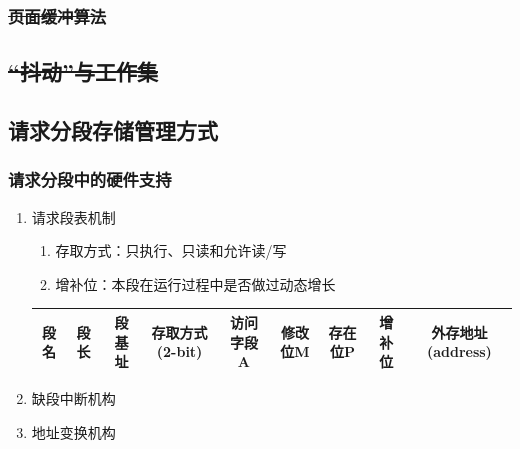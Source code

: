 \documentclass{article}
\begin{document}
\subsubsection{\sout{页面缓冲算法}}
\vspace*{-0.2cm}
\subsection{\sout{“抖动”与工作集}}
\vspace*{-0.2cm}

\subsection{请求分段存储管理方式}
\subsubsection{\color{red}请求分段中的硬件支持}
\begin{enumerate}
    \item 请求段表机制
    \begin{enumerate}
        \item 存取方式：只执行、只读和允许读/写
        \item 增补位：本段在运行过程中是否做过动态增长
    \end{enumerate}

    \begin{center}
        \begin{adjustbox}{width=\textwidth,center}
            \begin{tabular}{|c|c|c|c|c|c|c|c|c|}
                \hline
                {\color{gray}段名} & {\color{gray}段长}& {\color{gray}段基址}
                & 存取方式{\color{red}(2-bit)} & 访问字段A
                & 修改位M & 存在位P
                & 增补位   & 外存地址{\color{red}(address)} \\
                \hline
            \end{tabular}
        \end{adjustbox}
    \end{center}
    \item 缺段中断机构
    \item 地址变换机构
\end{enumerate}
\end{document}
